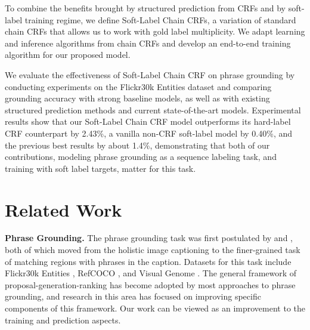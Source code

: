 \documentclass[11pt,a4paper]{article}
\newcommand{\smallsection}[1]{{\noindent\textbf{#1.}}}
\begin{document}
To combine the benefits brought by structured prediction from CRFs and by soft-label training regime, we define Soft-Label Chain CRFs, a variation of standard chain CRFs that allows us to work with gold label multiplicity. We adapt learning and inference algorithms from chain CRFs and develop an end-to-end training algorithm for our proposed model. 

We evaluate the effectiveness of Soft-Label Chain CRF on phrase grounding by conducting experiments on the Flickr30k Entities dataset \cite{DBLP:journals/ijcv/PlummerWCCHL17} and comparing grounding accuracy with strong baseline models, as well as with existing structured prediction methods and current state-of-the-art models. Experimental results show that our Soft-Label Chain CRF model outperforms its hard-label CRF counterpart by 2.43\%, a vanilla non-CRF soft-label model by 0.40\%, and the previous best results by about 1.4\%, demonstrating that both of our contributions, modeling phrase grounding as a sequence labeling task, and training with soft label targets, matter for this task. 

\section{Related Work}
\label{sec:related-work}

\smallsection{Phrase Grounding} The phrase grounding task was first postulated by \citet{DBLP:journals/pami/KarpathyF17} and \citet{DBLP:journals/ijcv/PlummerWCCHL17}, both of which moved from the holistic image captioning to the finer-grained task of matching regions with phrases in the caption. Datasets for this task include Flickr30k Entities \cite{DBLP:journals/ijcv/PlummerWCCHL17}, RefCOCO \cite{DBLP:conf/eccv/YuPYBB16}, and Visual Genome \cite{DBLP:journals/ijcv/KrishnaZGJHKCKL17}. The general framework of proposal-generation-ranking has become  adopted by most approaches to phrase grounding, and research in this area has focused on improving specific components of this framework. Our work can be viewed as an improvement to the training and prediction aspects. 
\end{document}

